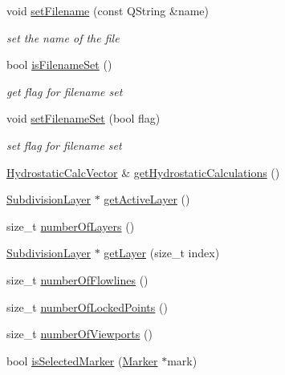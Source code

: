 \begin{DoxyCompactItemize}
void \hyperlink{classShipCAD_1_1ShipCADModel_a07daf75d876f80296f841f5c8d2327cb}{set\-Filename} (const Q\-String \&name)
\begin{DoxyCompactList}\small\item\em set the name of the file \end{DoxyCompactList}\item 
bool \hyperlink{classShipCAD_1_1ShipCADModel_af63013461d2ef6ee7221d72a42949d7c}{is\-Filename\-Set} ()
\begin{DoxyCompactList}\small\item\em get flag for filename set \end{DoxyCompactList}\item 
void \hyperlink{classShipCAD_1_1ShipCADModel_a960f3e97ef2aa847c9bb7cdc7731cd39}{set\-Filename\-Set} (bool flag)
\begin{DoxyCompactList}\small\item\em set flag for filename set \end{DoxyCompactList}\item 
\hyperlink{namespaceShipCAD_a0c7b012d8868cbb43871cf0bf303ccc6}{Hydrostatic\-Calc\-Vector} \& \hyperlink{classShipCAD_1_1ShipCADModel_aafc30dd7d6b9db4ccfc7bf1c4e2b3b11}{get\-Hydrostatic\-Calculations} ()
\item 
\hyperlink{classShipCAD_1_1SubdivisionLayer}{Subdivision\-Layer} $\ast$ \hyperlink{classShipCAD_1_1ShipCADModel_a5aa1e9aa14350f2e0980112a81613ca6}{get\-Active\-Layer} ()
\item 
size\-\_\-t \hyperlink{classShipCAD_1_1ShipCADModel_afb23b08b1014fc176ff864b8f154a84b}{number\-Of\-Layers} ()
\item 
\hyperlink{classShipCAD_1_1SubdivisionLayer}{Subdivision\-Layer} $\ast$ \hyperlink{classShipCAD_1_1ShipCADModel_ae13e425deb59f7b4f0c95cc02230f097}{get\-Layer} (size\-\_\-t index)
\item 
size\-\_\-t \hyperlink{classShipCAD_1_1ShipCADModel_afdb9bccb1cf9e3bf8aa853d81ff11d39}{number\-Of\-Flowlines} ()
\item 
size\-\_\-t \hyperlink{classShipCAD_1_1ShipCADModel_afb8cc5aaf19a6c1c687550fd9de1739e}{number\-Of\-Locked\-Points} ()
\item 
size\-\_\-t \hyperlink{classShipCAD_1_1ShipCADModel_a099d0530e99261318f6332220a331010}{number\-Of\-Viewports} ()
\item 
bool \hyperlink{classShipCAD_1_1ShipCADModel_ada688a626562a513c03f0a19c6233eae}{is\-Selected\-Marker} (\hyperlink{classShipCAD_1_1Marker}{Marker} $\ast$mark)
\item 

\end{DoxyCompactItemize}

